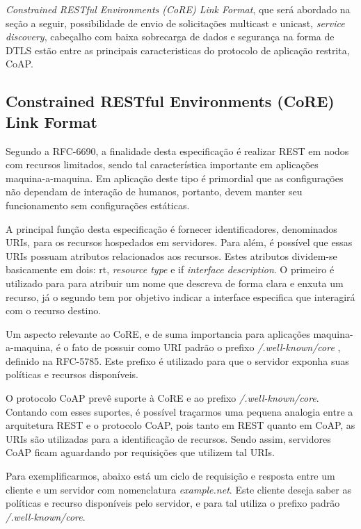 \textit{Constrained RESTful Environments (CoRE) Link Format}, que será abordado na seção a seguir, possibilidade de envio de solicitações multicast e unicast, \textit{service discovery}, cabeçalho com baixa sobrecarga de dados e segurança na forma de DTLS\cite{rfc6347}
estão entre as principais caracteristicas do protocolo de aplicação restrita, CoAP.

\subsection{Constrained RESTful Environments (CoRE) Link Format}

Segundo a RFC-6690, a finalidade desta especificação é realizar REST em nodos com recursos limitados, sendo tal característica importante em aplicações maquina-a-maquina\cite{rfc6690}.
Em aplicação deste tipo é primordial que as configurações não dependam de interação de humanos, portanto, devem manter seu funcionamento sem configurações estáticas.


A principal função desta especificação é fornecer identificadores, denominados URIs, para os recursos hospedados em servidores. 
Para além, é possível que essas URIs possuam atributos relacionados aos recursos.
Estes atributos dividem-se basicamente em dois: rt, \textit{resource type} e if \textit{interface description}.
O primeiro é utilizado para para atribuir um nome que descreva de forma clara e enxuta um recurso,
já o segundo tem por objetivo indicar a interface especifica que interagirá com o recurso destino.

Um aspecto relevante ao CoRE, e de suma importancia para aplicações maquina-a-maquina, é o fato de possuir como URI padrão o prefixo \textit{/.well-known/core} , definido na RFC-5785\cite{rfc5785}.
Este prefixo é utilizado para que o servidor exponha suas políticas e recursos disponíveis.

O protocolo CoAP prevê suporte à CoRE e ao prefixo \textit{/.well-known/core}.
Contando com esses suportes, é possível traçarmos uma pequena analogia entre a arquitetura REST e o protocolo CoAP, pois tanto em REST quanto em CoAP, as URIs são utilizadas para a identificação de recursos.
Sendo assim, servidores CoAP ficam aguardando por requisições que utilizem tal URIs.

Para exemplificarmos, abaixo está um ciclo de requisição e resposta entre um cliente e um servidor com nomenclatura \textit{example.net}.
Este cliente deseja saber as políticas e recurso disponíveis pelo servidor, e para tal utiliza o prefixo padrão \textit{/.well-known/core}.

